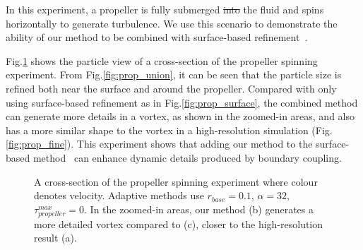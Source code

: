 \documentclass[VANCOUVER,STIX1COL]{WileyNJD-v2}
\providecommand{\DIFadd}[1]{{\protect\color{blue}\uwave{#1}}} %
\providecommand{\DIFdel}[1]{{\protect\color{red}\sout{#1}}}                      %
\providecommand{\DIFaddbegin}{} %
\providecommand{\DIFaddend}{} %
\providecommand{\DIFdelbegin}{} %
\providecommand{\DIFdelend}{} %
\providecommand{\DIFaddbeginFL}{} %
\providecommand{\DIFaddendFL}{} %
\providecommand{\DIFdelbeginFL}{} %
\providecommand{\DIFdelendFL}{} %
\begin{document}
In this experiment, a propeller is fully submerged \DIFdelbegin \DIFdel{into }\DIFdelend \DIFaddbegin \DIFadd{in }\DIFaddend the fluid and spins horizontally to generate turbulence. We use this scenario to demonstrate the ability of our method to be combined with surface-based refinement~\cite{Winchenbach17}.

Fig.\ref{fig:prop} shows the particle view of a cross-section of the propeller spinning experiment. From Fig.\ref{fig:prop_union}, it can be seen that the particle size is refined both near the surface and around the propeller. Compared with only using surface-based refinement as in Fig.\ref{fig:prop_surface}, the combined method can generate more details in a vortex, as shown in the zoomed-in areas, and also has a more similar shape to the vortex in a high-resolution simulation (Fig.\ref{fig:prop_fine}). This experiment shows that adding our method to the surface-based method~\cite{Winchenbach17} can enhance dynamic details produced by boundary coupling.

\begin{figure}[htbp]

\centering
\DIFdelbeginFL %
\DIFdelendFL \DIFaddbeginFL {}
\DIFaddendFL \vspace{-0.7\baselineskip}
\caption{
A cross-section of the propeller spinning experiment where colour denotes velocity. Adaptive methods use $r_{base} = 0.1$, $\alpha = 32$, $\tau^{max}_{propeller} = 0$. In the zoomed-in areas, our method (b) generates a more detailed vortex compared to (c), closer to the high-resolution result (a).
}
\label{fig:prop}

\end{figure}
\end{document}
